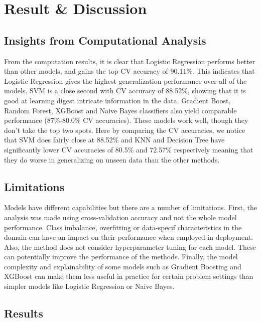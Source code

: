 \chapter{Result \& Discussion}
\section{Insights from Computational Analysis} 

From the computation results, it is clear that Logistic Regression performs better than other models, and gains the top CV accuracy of 90.11\%. This indicates that Logistic Regression gives the highest generalization performance over all of the models. SVM is a close second with CV accuracy of 88.52\%, showing that it is good at learning digest intricate information in the data. Gradient Boost, Random Forest, XGBoost and Naive Bayes  classifiers also yield comparable performance (87\%-80.0\% CV accuracies). These models work well, though they don’t take the top two spots. Here by comparing the CV accuracies, we notice that SVM does fairly close at 88.52\% and KNN and Decision Tree have significantly lower CV accuracies of 80.5\% and 72.57\% respectively meaning that they do worse in generalizing on unseen data than the other methods.




\section{Limitations} 

Models have different capabilities but there are a number of limitations. First, the analysis was made using cross-validation accuracy and not the whole model performance. Class imbalance, overfitting or data-specif characteristics in the domain can have an impact on their performance when employed in deployment. Also, the method does not consider hyperparameter tuning for each model. These can potentially improve the performance of the methods. Finally, the model complexity and explainability of some models such as Gradient Boosting and XGBoost can make them less useful in practice for certain problem settings than simpler models like Logistic Regression or Naive Bayes.


\section{Results}



